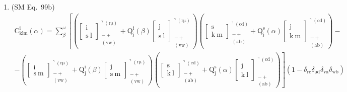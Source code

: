 \documentclass[12pt]{article}
\begin{document}
\begin{enumerate}[label=(\arabic*), series=formellist]
    \item (SM Eq.\ 99b) 
    \[
    \begin{gathered}
    \mathrm{C}^\mathrm{i}_{\mathrm{klm}}(\alpha) = \sum_\beta^\omega \left[ \left( \left[ \begin{smallmatrix} \mathrm{i} \\ \mathrm{s\ l} \end{smallmatrix} \right]^{\urcorner(\mathrm{r\mu})}_{\substack{- + \\ (\mathrm{vw})}} + \mathrm{Q}^\mathrm{i}_\mathrm{j}(\beta) \left[ \begin{smallmatrix} \mathrm{j} \\ \mathrm{s\ l} \end{smallmatrix} \right]^{\urcorner(\mathrm{r\mu})}_{\substack{- + \\ (\mathrm{vw})}} \right) \left( \left[ \begin{smallmatrix} \mathrm{s} \\ \mathrm{k\ m} \end{smallmatrix} \right]^{\urcorner(\mathrm{cd})}_{\substack{- + \\ (\mathrm{ab})}} + \mathrm{Q}^\mathrm{s}_\mathrm{j}(\alpha) \left[ \begin{smallmatrix} \mathrm{j} \\ \mathrm{k\ m} \end{smallmatrix} \right]^{\urcorner(\mathrm{cd})}_{\substack{- + \\ (\mathrm{ab})}} \right) - \right. \\
    \left. - \left( \left[ \begin{smallmatrix} \mathrm{i} \\ \mathrm{s\ m} \end{smallmatrix} \right]^{\urcorner(\mathrm{r\mu})}_{\substack{- + \\ (\mathrm{vw})}} + \mathrm{Q}^\mathrm{i}_\mathrm{j}(\beta) \left[ \begin{smallmatrix} \mathrm{j} \\ \mathrm{s\ m} \end{smallmatrix} \right]^{\urcorner(\mathrm{r\mu})}_{\substack{- + \\ (\mathrm{vw})}} \right) \left( \left[ \begin{smallmatrix} \mathrm{s} \\ \mathrm{k\ l} \end{smallmatrix} \right]^{\urcorner(\mathrm{cd})}_{\substack{- + \\ (\mathrm{ab})}} + \mathrm{Q}^\mathrm{s}_\mathrm{j}(\alpha) \left[ \begin{smallmatrix} \mathrm{j} \\ \mathrm{k\ l} \end{smallmatrix} \right]^{\urcorner(\mathrm{cd})}_{\substack{- + \\ (\mathrm{ab})}} \right) \right] (1 - \delta_{\mathrm{rc}}\delta_{\mathrm{\mu d}}\delta_{\mathrm{va}}\delta_{\mathrm{wb}}) \\

\end{gathered}\]
\end{enumerate}
\end{document}
